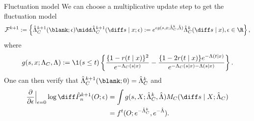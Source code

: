\documentclass[smaller]{beamer}\usepackage{listings}
\begin{document}
\begin{frame}[label={sec:orgffdaf49}]{Fluctuation model}
We can choose a multiplicative update step to get the fluctuation model
\begin{equation*}
  \mathcal{F}^{k+1}:=
  \left\{
    \hat{\Lambda}_C^{k+1}(\blank;\epsilon) \midd 
    \hat{\Lambda}_C^{k+1}(\diff s \mid x ; \epsilon) :=  e^{\epsilon g(s, x ;
      \hat{\Lambda}_C^k, \hat{\Lambda} )}  \hat{\Lambda}_C^{k}( \diff s \mid x ),
    \epsilon \in \R
  \right\},
\end{equation*}
where
\begin{equation*}
  g(s, x ; \Lambda_C, \Lambda) :=
  \1(s \leq t)\left\{
    \frac{\{1-r(t \mid x)\}^2}{e^{-\Lambda_C(s \mid x)}}
    - \frac{\{1-2r(t \mid x)\} e^{-\Lambda(t \mid x)}} {e^{-\Lambda_C(s \mid x) - \Lambda(s \mid x)}}
  \right\}.
\end{equation*}
\pause One can then verify that $\hat{\Lambda}_C^{k+1}(\blank;0) = \hat{\Lambda}_C^{k}$ and 
\begin{align*}
  \frac{\partial }{\partial \epsilon} \Big\vert_{\epsilon=0}\log\diff \hat{P}_n^{k+1}(O; \epsilon)
  & = \int g(s, X; \hat{\Lambda}_C^k, \hat{\Lambda})  M_C(\diff s \mid X; \hat{\Lambda}_C)
  \\ & = f^t(O; e^{-\hat{\Lambda}_C^k}, e^{-\hat{\Lambda}}).
\end{align*}
\end{frame}
\end{document}
